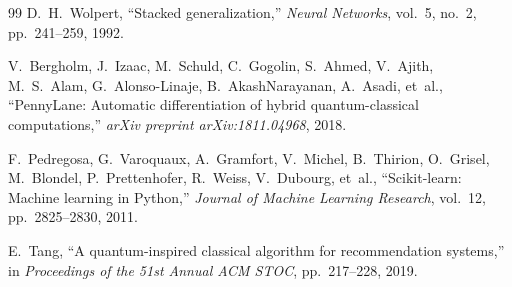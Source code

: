 \documentclass[journal,twocolumn]{IEEEtran}
\begin{document}
\begin{thebibliography}{99}
D.~H.~Wolpert,
``Stacked generalization,''
\emph{Neural Networks}, vol.~5, no.~2, pp.~241--259, 1992.

V.~Bergholm, J.~Izaac, M.~Schuld, C.~Gogolin, S.~Ahmed, V.~Ajith, M.~S.~Alam, G.~Alonso-Linaje, B.~AkashNarayanan, A.~Asadi, et~al.,
``PennyLane: Automatic differentiation of hybrid quantum-classical computations,''
\emph{arXiv preprint arXiv:1811.04968}, 2018.

F.~Pedregosa, G.~Varoquaux, A.~Gramfort, V.~Michel, B.~Thirion, O.~Grisel, M.~Blondel, P.~Prettenhofer, R.~Weiss, V.~Dubourg, et~al.,
``Scikit-learn: Machine learning in Python,''
\emph{Journal of Machine Learning Research}, vol.~12, pp.~2825--2830, 2011.

E.~Tang,
``A quantum-inspired classical algorithm for recommendation systems,''
in \emph{Proceedings of the 51st Annual ACM STOC}, pp.~217--228, 2019.

\end{thebibliography}
\end{document}
